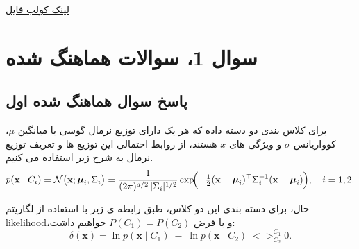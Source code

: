 \documentclass{article}
\begin{document}


\href{https://colab.research.google.com/drive/1nAa6jAqZ1ZJrHdWbSQSdEJEAOdABDY1T?usp=sharing}{لینک کولب فایل}

\tableofcontents

\section{سوال 1، سوالات هماهنگ شده}

\subsection{پاسخ سوال هماهنگ شده اول}
برای کلاس بندی دو دسته داده که هر یک دارای توزیع نرمال گوسی با میانگین $\mu$، کوواریانس $\sigma$ و ویژگی های $x$ هستند، از روابط احتمالی این توزیع ها و تعریف توزیع نرمال به شرح زیر استفاده می کنیم.
\begin{equation}
	p(\mathbf{x}\mid C_i)
	= \mathcal{N}\bigl(\mathbf{x};\boldsymbol\mu_i,\Sigma_i\bigr)
	= \frac{1}{(2\pi)^{d/2}\,\lvert\Sigma_i\rvert^{1/2}}
	\exp\!\Bigl(-\tfrac12(\mathbf{x}-\boldsymbol\mu_i)^\top\Sigma_i^{-1}(\mathbf{x}-\boldsymbol\mu_i)\Bigr),
	\quad i=1,2.
\end{equation}

حال، برای دسته بندی این دو کلاس، طبق رابطه ی زیر با استفاده از لگاریتم likelihood،و با فرض $P(C_1)=P(C_2)$ خواهیم داشت:
\begin{equation}
	  \delta(\mathbf{x})
	=\ln p(\mathbf{x}\mid C_1)\;-\;\ln p(\mathbf{x}\mid C_2)
	\;<>_{C_2}^{C_1}0.
\end{equation} 
\end{document}
